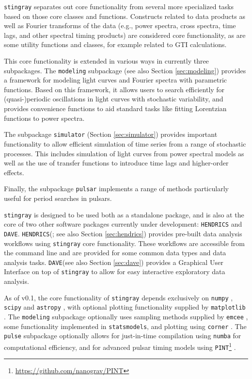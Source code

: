 \documentclass[twocolumn]{aastex62}
\newcommand{\stingray}{\texttt{stingray}\xspace}
\newcommand{\hendrics}{\texttt{HENDRICS}\xspace}
\newcommand{\dave}{\texttt{DAVE}\xspace}
\begin{document}
\stingray separates out core functionality from several more specialized tasks based on those core classes and functions. Constructs related to data products as well as Fourier transforms of the data (e.g., power spectra, cross spectra, time lags, and other spectral timing products) are considered core functionality, as are some utility functions and classes, for example related to GTI calculations. 

This core functionality is extended in various ways in currently three subpackages. 
The \texttt{modeling} subpackage (see also Section \ref{sec:modeling}) provides a framework for modeling light curves and Fourier spectra with parametric functions. 
Based on this framework, it allows users to search efficiently for (quasi-)periodic oscillations in light curves with stochastic variability, and provides convenience functions to aid standard tasks like fitting Lorentzian functions to power spectra. 

The subpackage \texttt{simulator} (Section \ref{sec:simulator}) provides important functionality to allow efficient simulation of time series from a range of stochastic processes. This includes simulation of light curves from power spectral models as well as the use of transfer functions to introduce time lags and higher-order effects. 

Finally, the subpackage \texttt{pulsar} implements a range of methods particularly useful for period searches in pulsars.

\stingray is designed to be used both as a standalone package, and is also at the core of two other software packages currently under development: 
\hendrics and \dave. 
\hendrics (\citealt{hendrics}; see also Section \ref{sec:hendrics}) provides pre-built data analysis workflows using \stingray core functionality. 
These workflows are accessible from the command line and are provided for some common data types and data analysis tasks. 
\dave (see also Section \ref{sec:dave}) provides a Graphical User Interface on top of \stingray to allow for easy interactive exploratory data analysis.
 
As of v0.1, the core functionality of \stingray depends exclusively on \texttt{numpy} \citep{numpy}, \texttt{scipy} \citep{scipy} and \texttt{astropy} \citep{astropy}, with optional plotting functionality supplied by \texttt{matplotlib} \citep{matplotlib} . 
The \texttt{modeling} subpackage optionally uses sampling methods supplied by \texttt{emcee} \citep{emcee}, some functionality implemented in \texttt{statsmodels}, and plotting using \texttt{corner} \citep{corner}. 
The \texttt{pulse} subpackage optionally allows for just-in-time compilation using \texttt{numba} \citep{numba} for computational efficiency, and for advanced pulsar timing models using \texttt{PINT}\footnote{\url{https://github.com/nanograv/PINT}} .
\end{document}
